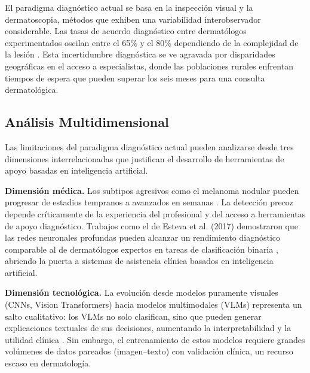 \documentclass[11pt, a4paper]{article}
\begin{document}
El paradigma diagnóstico actual se basa en la inspección visual y la dermatoscopia, métodos que exhiben una variabilidad interobservador considerable. Las tasas de acuerdo diagnóstico entre dermatólogos experimentados oscilan entre el 65\% y el 80\% dependiendo de la complejidad de la lesión \cite{khan_ensemble_2025}. Esta incertidumbre diagnóstica se ve agravada por disparidades geográficas en el acceso a especialistas, donde las poblaciones rurales enfrentan tiempos de espera que pueden superar los seis meses para una consulta dermatológica.


\subsection{Análisis Multidimensional}

Las limitaciones del paradigma diagnóstico actual pueden analizarse desde tres dimensiones interrelacionadas que justifican el desarrollo de herramientas de apoyo basadas en inteligencia artificial.

\textbf{Dimensión médica.} Los subtipos agresivos como el melanoma nodular pueden progresar de estadios tempranos a avanzados en semanas \cite{khan_ensemble_2025}. La detección precoz depende críticamente de la experiencia del profesional y del acceso a herramientas de apoyo diagnóstico. 
Trabajos como el de Esteva et al. (2017) demostraron que las redes neuronales profundas pueden alcanzar un rendimiento diagnóstico comparable al de dermatólogos expertos en tareas de clasificación binaria \cite{esteva_dermatologist_2017}, abriendo la puerta a sistemas de asistencia clínica basados en inteligencia artificial.

\textbf{Dimensión tecnológica.} La evolución desde modelos puramente visuales (CNNs, Vision Transformers) hacia modelos multimodales (VLMs) representa un salto cualitativo: los VLMs no solo clasifican, sino que pueden generar explicaciones textuales de sus decisiones, aumentando la interpretabilidad y la utilidad clínica \cite{hartsock_vision-language_2024}. Sin embargo, el entrenamiento de estos modelos requiere grandes volúmenes de datos pareados (imagen--texto) con validación clínica, un recurso escaso en dermatología.
\end{document}
